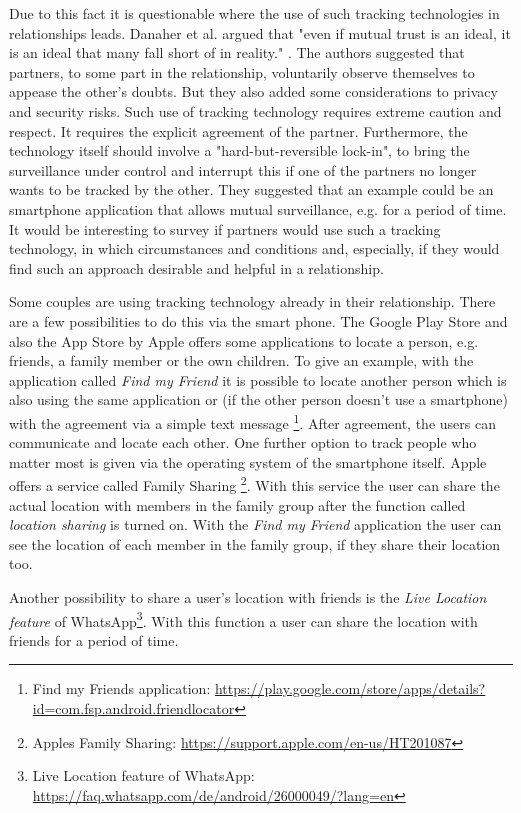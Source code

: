 Due to this fact it is questionable where the use of such tracking technologies in relationships leads.
Danaher et al. argued that "even if mutual trust is an ideal, it is an ideal that many fall short of in reality." \cite{doi:10.1080/15265161.2017.1409823}.
The authors suggested that partners, to some part in the relationship, voluntarily observe themselves to appease the other's doubts. But they also added some considerations to privacy and security risks. Such use of tracking technology requires extreme caution and respect. It requires the explicit agreement of the partner. Furthermore, the technology itself should involve a "hard-but-reversible lock-in", to bring the surveillance under control and interrupt this if one of the partners no longer wants to be tracked by the other.
They suggested that an example could be an smartphone application that allows mutual surveillance, e.g. for a period of time.
It would be interesting to survey if partners would use such a tracking technology, in which circumstances and conditions and, especially, if they would find such an approach desirable and helpful in a relationship. 

Some couples are using tracking technology already in their relationship. %
There are a few possibilities to do this via the smart phone. The Google Play Store and also the App Store by Apple offers some applications to locate a person, e.g. friends, a family member or the own children. To give an example, with the application called \textit{Find my Friend} it is possible to locate another person which is also using the same application or (if the other person doesn't use a smartphone) with the agreement via a simple text message \footnote{Find my Friends application: \url{https://play.google.com/store/apps/details?id=com.fsp.android.friendlocator}}. After agreement, the users can communicate and locate each other.
One further option to track people who matter most is given via the operating system of the smartphone itself. Apple offers a service called Family Sharing \footnote{Apples Family Sharing: \url{https://support.apple.com/en-us/HT201087}}. With this service the user can share the actual location with members in the family group after the function called \textit{location sharing} is turned on. With the \textit{Find my Friend} application the user can see the location of each member in the family group, if they share their location too.

Another possibility to share a user's location with friends is the \textit{Live Location feature} of WhatsApp\footnote{Live Location feature of WhatsApp: \url{https://faq.whatsapp.com/de/android/26000049/?lang=en}}. With this function a user can share the location with friends for a period of time.

